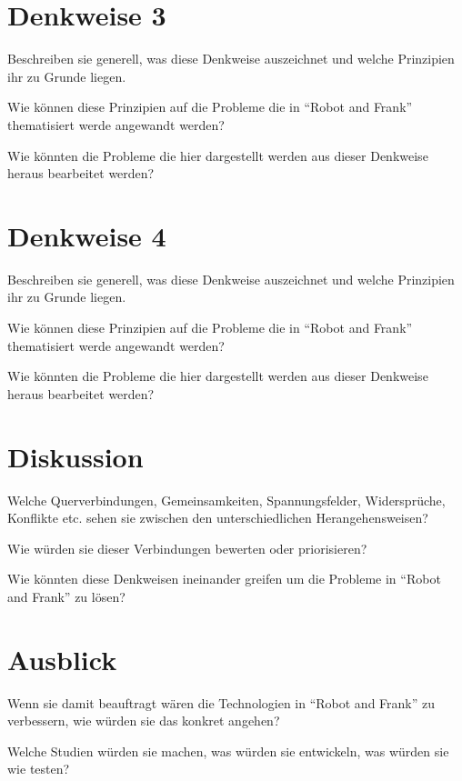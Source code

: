 \documentclass[sigchi-a, authorversion]{acmart}
\begin{document}
\section{Denkweise 3}

Beschreiben sie generell, was diese Denkweise auszeichnet und welche Prinzipien ihr zu Grunde liegen.

Wie können diese Prinzipien auf die Probleme die in ``Robot and Frank'' thematisiert werde angewandt werden?

Wie könnten die Probleme die hier dargestellt werden aus dieser Denkweise heraus bearbeitet werden?

\section{Denkweise 4}

Beschreiben sie generell, was diese Denkweise auszeichnet und welche Prinzipien ihr zu Grunde liegen.

Wie können diese Prinzipien auf die Probleme die in ``Robot and Frank'' thematisiert werde angewandt werden?

Wie könnten die Probleme die hier dargestellt werden aus dieser Denkweise heraus bearbeitet werden?


\section{Diskussion}

Welche Querverbindungen, Gemeinsamkeiten, Spannungsfelder, Widersprüche, Konflikte etc. sehen sie zwischen den unterschiedlichen Herangehensweisen?

Wie würden sie dieser Verbindungen bewerten oder priorisieren?

Wie könnten diese Denkweisen ineinander greifen um die Probleme in ``Robot and Frank'' zu lösen?

\section{Ausblick}

Wenn sie damit beauftragt wären die Technologien in ``Robot and Frank'' zu verbessern, wie würden sie das konkret angehen?

Welche Studien würden sie machen, was würden sie entwickeln, was würden sie wie testen?






\end{document}
